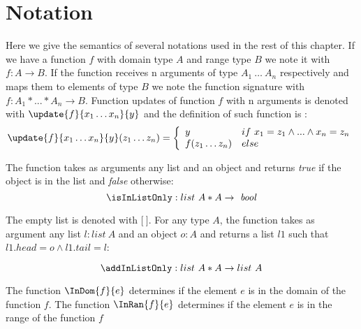 
 \section{Notation}\label{notation}
 Here we give the semantics of several notations used in the rest of this chapter.
 If we have a function $f$ with  domain type  $A$ and range type $B$
 we note it with $f : A \rightarrow B$. If the function receives n arguments of type $A_1 \ \ldots \ A_n$ respectively
 and maps them to elements of type $B$
 we note the function signature with $f : A_1 * ...*A_n \rightarrow B$.   
 Function updates of function $f$ with n arguments is denoted with $ \update{f}{x_1 \ldots x_n}{y} $ and the definition of such function is :
 $$  \update{f}{x_1 \ldots x_n }{y}(z_1 \ldots z_n) = 
    \left\{\begin{array}{ll}
                  y & if \ x_1 = z_1 \wedge ...\wedge x_n = z_n \\
		  f(z_1 \ldots z_n ) & else
           \end{array}\right.$$
 
 The function \isInListOnly  takes as arguments any list and an object and  returns \textit{true} if the object is in the 
 list and \textit{false} otherwise:
 $$ \isInListOnly : list \ A * A \rightarrow \mbox{ \rm \textit{bool}}$$
 

The empty list is denoted with $\lbrack \ \rbrack$. For any type $A$, the function \addInListOnly takes as argument any list $l: list \ A$ and an object 
$o: A$ and returns a list $l1 $ such that $l1.head = o \wedge l1.tail = l$: 
 
$$ \addInListOnly : list \ A * A \rightarrow  list \ A $$

The function $\InDom{f}{ e }$ determines if the element $e$ is in the domain of the function $f$.
The function $\InRan{f}{e}$ determines if the element $e$ is in the range of the function $f$
